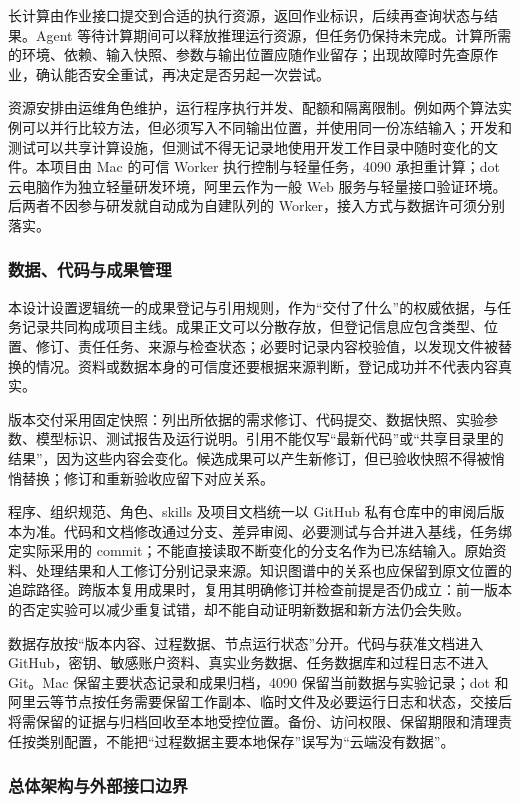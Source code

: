 \documentclass[11pt,a4paper]{article}
\begin{document}
长计算由作业接口提交到合适的执行资源，返回作业标识，后续再查询状态与结果。Agent 等待计算期间可以释放推理运行资源，但任务仍保持未完成。计算所需的环境、依赖、输入快照、参数与输出位置应随作业留存；出现故障时先查原作业，确认能否安全重试，再决定是否另起一次尝试。

资源安排由运维角色维护，运行程序执行并发、配额和隔离限制。例如两个算法实例可以并行比较方法，但必须写入不同输出位置，并使用同一份冻结输入；开发和测试可以共享计算设施，但测试不得无记录地使用开发工作目录中随时变化的文件。本项目由 Mac 的可信 Worker 执行控制与轻量任务，4090 承担重计算；dot 云电脑作为独立轻量研发环境，阿里云作为一般 Web 服务与轻量接口验证环境。后两者不因参与研发就自动成为自建队列的 Worker，接入方式与数据许可须分别落实。

\subsubsection{数据、代码与成果管理}

本设计设置逻辑统一的成果登记与引用规则，作为“交付了什么”的权威依据，与任务记录共同构成项目主线。成果正文可以分散存放，但登记信息应包含类型、位置、修订、责任任务、来源与检查状态；必要时记录内容校验值，以发现文件被替换的情况。资料或数据本身的可信度还要根据来源判断，登记成功并不代表内容真实。

版本交付采用固定快照：列出所依据的需求修订、代码提交、数据快照、实验参数、模型标识、测试报告及运行说明。引用不能仅写“最新代码”或“共享目录里的结果”，因为这些内容会变化。候选成果可以产生新修订，但已验收快照不得被悄悄替换；修订和重新验收应留下对应关系。

程序、组织规范、角色、skills 及项目文档统一以 GitHub 私有仓库中的审阅后版本为准。代码和文档修改通过分支、差异审阅、必要测试与合并进入基线，任务绑定实际采用的 commit；不能直接读取不断变化的分支名作为已冻结输入。原始资料、处理结果和人工修订分别记录来源。知识图谱中的关系也应保留到原文位置的追踪路径。跨版本复用成果时，复用其明确修订并检查前提是否仍成立：前一版本的否定实验可以减少重复试错，却不能自动证明新数据和新方法仍会失败。

数据存放按“版本内容、过程数据、节点运行状态”分开。代码与获准文档进入 GitHub，密钥、敏感账户资料、真实业务数据、任务数据库和过程日志不进入 Git。Mac 保留主要状态记录和成果归档，4090 保留当前数据与实验记录；dot 和阿里云等节点按任务需要保留工作副本、临时文件及必要运行日志和状态，交接后将需保留的证据与归档回收至本地受控位置。备份、访问权限、保留期限和清理责任按类别配置，不能把“过程数据主要本地保存”误写为“云端没有数据”。

\subsubsection{总体架构与外部接口边界}
\end{document}
